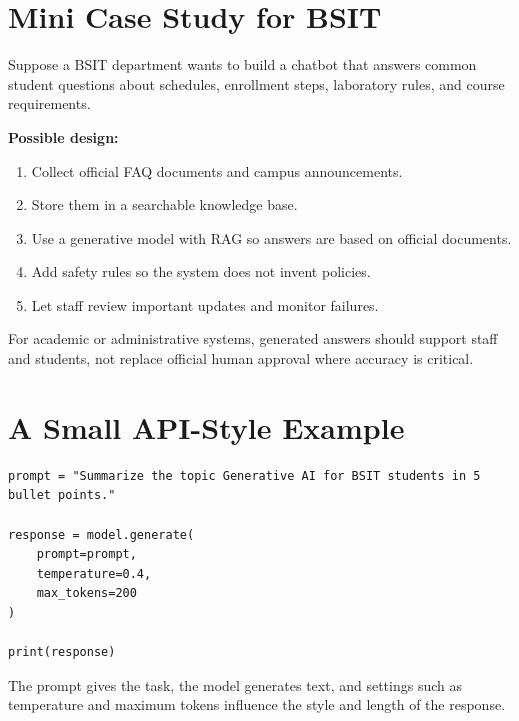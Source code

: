 \documentclass[11pt,a4paper]{article}
\begin{document}
\section{Mini Case Study for BSIT}

\begin{definitionbox}
Suppose a BSIT department wants to build a chatbot that answers common student questions about schedules, enrollment steps, laboratory rules, and course requirements.
\end{definitionbox}

\textbf{Possible design:}
\begin{enumerate}[leftmargin=*]
  \item Collect official FAQ documents and campus announcements.
  \item Store them in a searchable knowledge base.
  \item Use a generative model with RAG so answers are based on official documents.
  \item Add safety rules so the system does not invent policies.
  \item Let staff review important updates and monitor failures.
\end{enumerate}

\begin{alertbox}
For academic or administrative systems, generated answers should support staff and students, not replace official human approval where accuracy is critical.
\end{alertbox}

\section{A Small API-Style Example}

\begin{lstlisting}
prompt = "Summarize the topic Generative AI for BSIT students in 5 bullet points."

response = model.generate(
    prompt=prompt,
    temperature=0.4,
    max_tokens=200
)

print(response)
\end{lstlisting}

\begin{conceptbox}
The prompt gives the task, the model generates text, and settings such as temperature and maximum tokens influence the style and length of the response.
\end{conceptbox}
\end{document}
